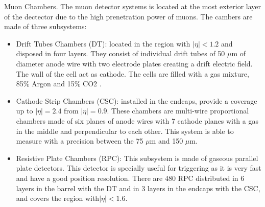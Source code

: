 \documentclass[8pt]{beamer}
\begin{document}
\begin{frame}[fragile]{Muon Chambers.}
	The muon detector systems is located at the most exterior layer of the dectector due to the high prenetration power of muons. The cambers are made of three subsystems:
	

		\begin{itemize}
			\item  Drift Tubes Chambers (DT): located in the region with $ |\eta|< 1.2$ and disposed in four layers. They consist of individual drift tubes of 50 $\mu$m of diameter anode wire with two electrode plates creating a drift electric field.
			The wall of the cell act as cathode. The cells are filled with a gas mixture,
			85\% Argon and 15\% CO2 .
			
						
			\item  Cathode Strip Chambers (CSC): installed in the endcaps, provide a coverage up to $|\eta| = 2.4$ from $|\eta| = 0.9$. These chambers are multi-wire proportional chambers made of six planes of anode wires with 7 cathode planes with a gas in the middle and perpendicular to each other. This system is able to measure with a precision between the 75 $\mu$m and 150 $\mu$m.
			\item  Resistive Plate Chambers (RPC): This subsystem is made of gaseous parallel plate detectors. This detector is specially useful for triggering as it is very fast and have a good position resolution. There are 480 RPC distributed in	6 layers in the barrel with the DT and in 3 layers in the endcaps with the CSC, and covers the region with$|\eta|  < 1.6$.
			
		\end{itemize}
		
		
\end{frame}
\end{document}
